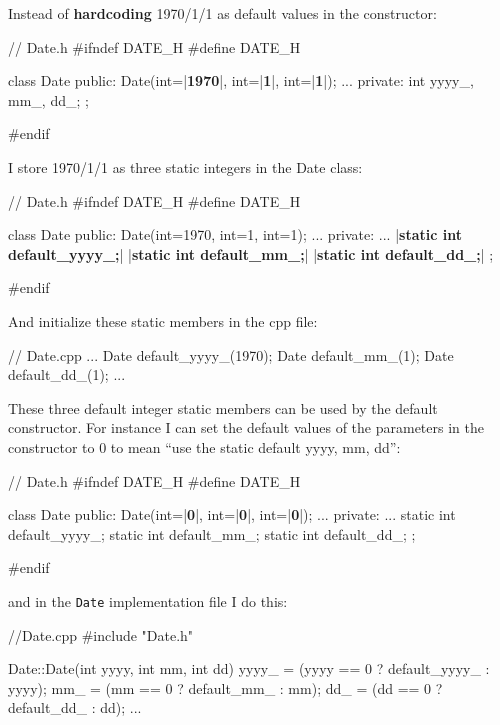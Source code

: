 Instead of \textbf{hardcoding} 1970/1/1 as default values in the
constructor:

\begin{consolethree}[escapeinside=||]
// Date.h
#ifndef DATE_H
#define DATE_H

class Date
{
public:
    Date(int=|{\bf 1970}|, int=|{\bf 1}|, int=|{\bf 1}|);
    ...
private:
    int yyyy_, mm_, dd_;
};

#endif
\end{consolethree}

I store 1970/1/1 as three static integers in the Date class:

\begin{consolethree}[escapeinside=||]
// Date.h
#ifndef DATE_H
#define DATE_H

class Date
{
public:
    Date(int=1970, int=1, int=1);
    ...
private:
    ...
    |{\bf static int default\_yyyy\_;}|
    |{\bf static int default\_mm\_;}|
    |{\bf static int default\_dd\_;}|
};

#endif
\end{consolethree}

And initialize these static members in the cpp file:

\begin{consolethree}[escapeinside=||]
// Date.cpp
...
Date default_yyyy_(1970);
Date default_mm_(1);
Date default_dd_(1);
...
\end{consolethree}

These three default integer static members can be used by the default
constructor. For instance I can set the default values of the parameters
in the constructor to 0 to mean ``use the static default yyyy, mm, dd'':

\begin{consolethree}[escapeinside=||]
// Date.h
#ifndef DATE_H
#define DATE_H

class Date
{
public:
    Date(int=|{\bf 0}|, int=|{\bf 0}|, int=|{\bf 0}|);
    ...
private:
    ...
    static int default_yyyy_;
    static int default_mm_;
    static int default_dd_;
};

#endif
\end{consolethree}

and in the \texttt{Date} implementation file I do this:

\begin{consolethree}[escapeinside=||]
//Date.cpp
#include "Date.h"

Date::Date(int yyyy, int mm, int dd)
{
    yyyy_ = (yyyy == 0 ? default_yyyy_ : yyyy);
    mm_ = (mm == 0 ? default_mm_ : mm);
    dd_ = (dd == 0 ? default_dd_ : dd);
}
...
\end{consolethree}

